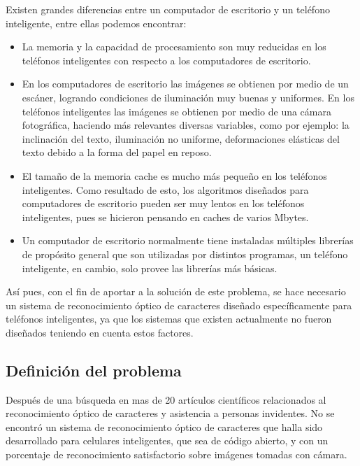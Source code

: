\documentclass[a4paper, 11pt, oneside]{article}
\begin{document}
	Existen grandes diferencias entre un computador de escritorio y un teléfono inteligente, entre ellas podemos encontrar:
	\begin{itemize}
	\item La memoria y la capacidad de procesamiento son muy reducidas en los teléfonos inteligentes con respecto a los computadores de escritorio.

	\item En los computadores de escritorio las imágenes se obtienen por medio de un escáner, logrando condiciones de iluminación muy buenas y uniformes. En los teléfonos inteligentes las imágenes se obtienen por medio de una cámara fotográfica, haciendo más relevantes diversas variables, como por ejemplo: la inclinación del texto, iluminación no uniforme, deformaciones elásticas del texto debido a la forma del papel en reposo.

	\item El tamaño de la memoria cache es mucho más pequeño en los teléfonos inteligentes. Como resultado de esto, los algoritmos diseñados para computadores de escritorio pueden ser muy lentos en los teléfonos inteligentes, pues se hicieron pensando en caches de varios Mbytes.

	\item Un computador de escritorio normalmente tiene instaladas múltiples librerías de propósito general que son utilizadas por distintos programas, un teléfono inteligente, en cambio, solo provee las librerías más básicas.
	\end{itemize}

	Así pues, con el fin de aportar a la solución de este problema, se hace necesario un sistema de reconocimiento óptico de caracteres diseñado específicamente para teléfonos inteligentes, ya que los sistemas que existen actualmente no fueron diseñados teniendo en cuenta estos factores. 
	
	\subsection{Definición del problema}
	Después de una búsqueda en mas de 20 artículos científicos relacionados al reconocimiento óptico
	de caracteres y asistencia a personas invidentes. No se encontró un sistema de reconocimiento
	óptico de caracteres que halla sido desarrollado para celulares inteligentes, que sea de 
	código abierto, y con un porcentaje de reconocimiento satisfactorio sobre imágenes tomadas con
	cámara.
	
	\clearpage
\end{document}
